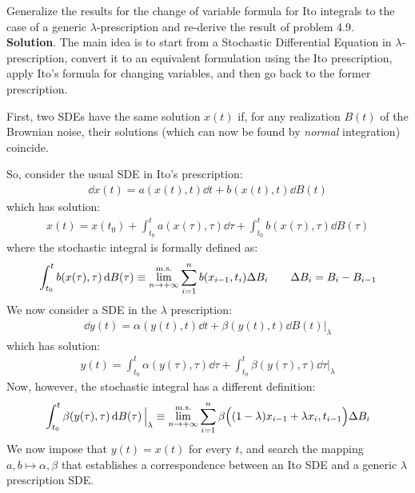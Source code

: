 \documentclass[../template.tex]{subfiles}
\begin{document}
\begin{exo}
    Generalize the results for the change of variable formula for Ito integrals to the case of a generic $\lambda$-prescription and re-derive the result of problem 4.9.\\
    
    \textbf{Solution}. The main idea is to start from a Stochastic Differential Equation in $\lambda$-prescription, convert it to an equivalent formulation using the Ito prescription, apply Ito's formula for changing variables, and then go back to the former prescription.
    
    First, two SDEs have the same solution $x(t)$ if, for any realization $B(t)$ of the Brownian noise, their solutions (which can now be found by \textit{normal} integration) coincide.
    
    So, consider the usual SDE in Ito's prescription:
    \begin{align*}
        \dd{x(t)} = a(x(t),t) \dd{t} + b(x(t),t) \dd{B(t)}
    \end{align*}
    which has solution:
    \begin{align*}
        x(t) = x(t_0) + \int_{t_0}^t a(x(\tau),\tau) \dd{\tau} + \int_{t_0}^t b(x(\tau), \tau) \dd{B(\tau)}
    \end{align*}
    where the stochastic integral is formally defined as:
    \begin{align*}
        \int_{t_0}^t b(x(\tau),\tau) \dd{B(\tau)} \equiv \overset{\rm m.s.}{\lim_{n \to +\infty}} \sum_{i=1}^n b(x_{i-1}, t_i) \Delta B_i \qquad \Delta B_i = B_i - B_{i-1}
    \end{align*}
    We now consider a  SDE in the $\lambda$ prescription:
    \begin{align*}
        \dd{y(t)} = \alpha(y(t),t) \dd{t} + \beta(y(t),t) \dd{B(t)} \big|_{\lambda}
    \end{align*}
    which has solution:
    \begin{align*}
        y(t) = \int_{t_0}^t \alpha(y(\tau), \tau) \dd{\tau} + \int_{t_0}^t \beta(y(\tau), \tau) \dd{\tau} \Big|_{\lambda}
    \end{align*}
    Now, however, the stochastic integral has a different definition:
    \begin{align*}
        \int_{t_0}^t \beta(y(\tau), \tau) \dd{B(\tau)} \Big|_{\lambda} \equiv \overset{\rm m.s.}{\lim_{n \to +\infty}} \sum_{i=1}^n \beta\Big( (1-\lambda) x_{i-1} + \lambda x_i, t_{i-1}\Big) \Delta B_i
    \end{align*}
    We now impose that $y(t) = x(t)$ for every $t$, and search the mapping $a,b \mapsto \alpha, \beta$ that establishes a correspondence between an Ito SDE and a generic $\lambda$ prescription SDE.\\
    

\end{exo}
\end{document}
